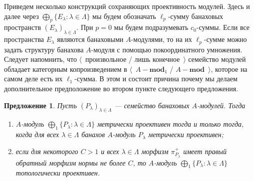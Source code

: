 \documentclass[12pt]{article}
\newtheorem{proposition}[theorem]{Предложение}
\begin{document}
Приведем несколько конструкций сохраняющих проективность модулей. Здесь и далее
через $\bigoplus_p \{ E_\lambda:\lambda\in\Lambda \}$ мы будем обозначать
$\ell_p$-сумму банаховых пространств ${(E_\lambda)}_{\lambda\in\Lambda}$. При
$p=0$ мы будем подразумевать $c_0$-суммы. Если все пространства $E_\lambda$
являются банаховыми $A$-модулями, то на их $\ell_p$-сумме можно задать структуру
банахова $A$-модуля с помощью покоординатного умножения. Следует напомнить, что
$\langle$~произвольное / лишь конечное~$\rangle$ семейство модулей обладает
категорным копроизведением в $\langle$~$A-\mathbf{mod}_1$ /
$A-\mathbf{mod}$~$\rangle$, которое на самом деле есть их $\ell_1$-сумма. В этом
и состоит причина почему мы делаем дополнительное предположение во втором пункте
следующего предложения.

\begin{proposition}\label{MetTopProjModCoprod} Пусть
    ${(P_\lambda)}_{\lambda\in\Lambda}$ --- семейство банаховых $A$-модулей.
    Тогда
    \begin{enumerate}[label = (\roman*)]
        \item $A$-модуль $\bigoplus_1 \{P_\lambda:\lambda\in\Lambda \}$ метрически
              проективен тогда и только тогда, когда для всех 
              $\lambda\in\Lambda$ банахов $A$-модуль $P_\lambda$ 
              метрически проективен;

        \item если для некоторого $C>1$ и всех $\lambda\in\Lambda$ морфизм
              $\pi_{P_\lambda}^+$ имеет правый обратный морфизм нормы не 
              более $C$, то $A$-модуль 
              $\bigoplus_1 \{P_\lambda:\lambda\in\Lambda \}$ 
              топологически проективен.
    \end{enumerate}


\end{proposition}
\end{document}
